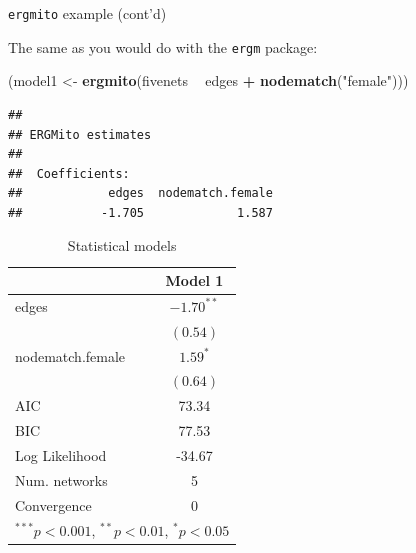 \documentclass[10pt,ignorenonframetext,handout,aspectratio=169,]{beamer}
\newenvironment{Shaded}{\begin{snugshade}}{\end{snugshade}}
\newcommand{\KeywordTok}[1]{\textcolor[rgb]{0.13,0.29,0.53}{\textbf{#1}}}
\newcommand{\NormalTok}[1]{#1}
\newcommand{\OperatorTok}[1]{\textcolor[rgb]{0.81,0.36,0.00}{\textbf{#1}}}
\newcommand{\StringTok}[1]{\textcolor[rgb]{0.31,0.60,0.02}{#1}}
\begin{document}
\begin{frame}[fragile]{\texttt{ergmito} example (cont'd)}
\protect\hypertarget{ergmito-example-contd}{}

The same as you would do with the \texttt{ergm} package:

\footnotesize

\begin{Shaded}
\begin{Highlighting}[]
\NormalTok{(model1 <-}\StringTok{ }\KeywordTok{ergmito}\NormalTok{(fivenets }\OperatorTok{~}\StringTok{ }\NormalTok{edges }\OperatorTok{+}\StringTok{ }\KeywordTok{nodematch}\NormalTok{(}\StringTok{"female"}\NormalTok{)))}
\end{Highlighting}
\end{Shaded}

\begin{verbatim}
## 
## ERGMito estimates
## 
##  Coefficients:
##            edges  nodematch.female  
##           -1.705             1.587
\end{verbatim}

\normalsize

\footnotesize

\begin{table}
\begin{center}
\begin{tabular}{l c }
\hline
 & Model 1 \\
\hline
edges            & $-1.70^{**}$ \\
                 & $(0.54)$     \\
nodematch.female & $1.59^{*}$   \\
                 & $(0.64)$     \\
\hline
AIC              & 73.34        \\
BIC              & 77.53        \\
Log Likelihood   & -34.67       \\
Num. networks    & 5            \\
Convergence      & 0            \\
\hline
\multicolumn{2}{l}{\scriptsize{$^{***}p<0.001$, $^{**}p<0.01$, $^*p<0.05$}}
\end{tabular}
\caption{Statistical models}
\label{table:coefficients}
\end{center}
\end{table}

\normalsize

\end{frame}
\end{document}
